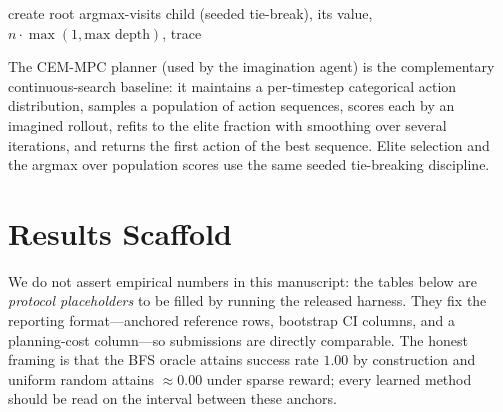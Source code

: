 \documentclass[11pt]{article}
\begin{document}
\begin{algorithm}[t]
\caption{MCTS plan step (one root action)}\label{alg:mcts}
create root\;
\Return argmax-visits child (seeded tie-break), its value, $n\cdot\max(1,\text{max depth})$, trace\;
\end{algorithm}

The CEM-MPC planner (used by the imagination agent) is the complementary continuous-search baseline: it maintains a per-timestep categorical action distribution, samples a population of action sequences, scores each by an imagined rollout, refits to the elite fraction with smoothing over several iterations, and returns the first action of the best sequence. Elite selection and the argmax over population scores use the same seeded tie-breaking discipline.

\section{Results Scaffold}
We do not assert empirical numbers in this manuscript: the tables below are \emph{protocol placeholders} to be filled by running the released harness. They fix the reporting format---anchored reference rows, bootstrap CI columns, and a planning-cost column---so submissions are directly comparable. The honest framing is that the BFS oracle attains success rate $1.00$ by construction and uniform random attains $\approx 0.00$ under sparse reward; every learned method should be read on the interval between these anchors.
\end{document}
